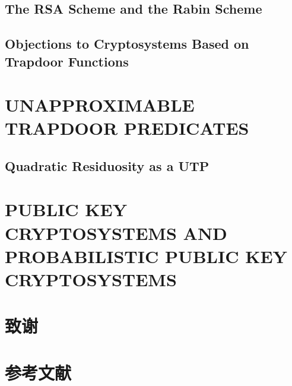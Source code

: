 \documentclass[]{article}
\begin{document}
\subsection{The RSA Scheme and the Rabin Scheme}



\subsection{Objections to Cryptosystems Based on Trapdoor Functions}



\section{UNAPPROXIMABLE TRAPDOOR PREDICATES}

\subsection{Quadratic Residuosity as a UTP}

\section{PUBLIC KEY CRYPTOSYSTEMS AND PROBABILISTIC	PUBLIC KEY CRYPTOSYSTEMS}

\section*{致谢}

\section*{参考文献}
\end{document}
